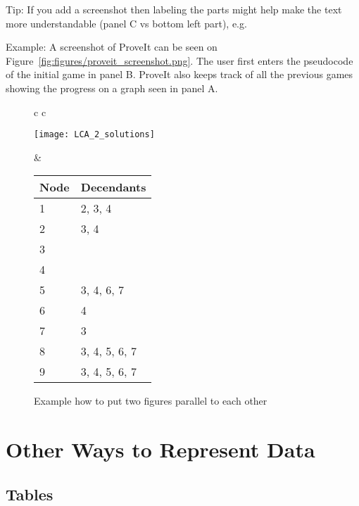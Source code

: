 \documentclass[12pt]{article}
\newcommand{\proveit} {ProveIt\xspace}
\begin{document}
Tip: If you add a screenshot then labeling the parts might help make the text more understandable (panel C vs bottom left part), e.g.
 
Example: A screenshot of \proveit can be seen on Figure~\ref{fig:figures/proveit_screenshot.png}. The user first enters the pseudocode of the initial game in panel B. \proveit also keeps track of all the previous games showing the progress on a graph seen in panel A.


\begin{figure} [!ht]
\begin{tabular}{c c}

\begin{minipage}{0.45\textwidth}
\texttt{[image: LCA\_2\_solutions]}
\end{minipage}

&
\begin{minipage}{0.55\textwidth}
\centering
\begin{tabular}{ l | l |}
	Node & Decendants \\ \hline
  1 & 2, 3, 4 \\ \hline
  2 & 3, 4 \\ \hline
  3 & \\ \hline
  4 & \\ \hline
  5 & 3, 4, 6, 7 \\ \hline
  6 & 4 \\ \hline
  7 & 3 \\  \hline
  8 & 3, 4, 5, 6, 7\\ \hline
  9 & 3, 4, 5, 6, 7\\ \hline
\end{tabular}

\end{minipage}

\end{tabular}

\caption{Example how to put two figures parallel to each other}
\label{fig:LCA_2_solutions}
\end{figure}







\clearpage %
\section{Other Ways to Represent Data}

\subsection{Tables}
\end{document}
